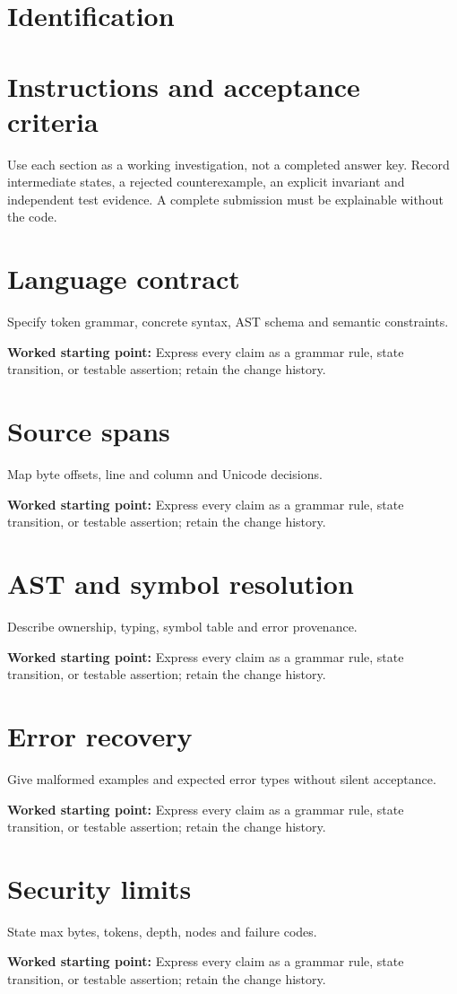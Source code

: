 \documentclass[11pt,letterpaper]{article}
\begin{document}
\makedoctitle\makedocsummary
\tableofcontents\clearpage
\section{Identification}
\section{Instructions and acceptance criteria}
Use each section as a working investigation, not a completed answer key. Record intermediate states, a rejected counterexample, an explicit invariant and independent test evidence. A complete submission must be explainable without the code.
\section{Language contract}
Specify token grammar, concrete syntax, AST schema and semantic constraints.\par\textbf{Worked starting point:} Express every claim as a grammar rule, state transition, or testable assertion; retain the change history.
\section{Source spans}
Map byte offsets, line and column and Unicode decisions.\par\textbf{Worked starting point:} Express every claim as a grammar rule, state transition, or testable assertion; retain the change history.
\section{AST and symbol resolution}
Describe ownership, typing, symbol table and error provenance.\par\textbf{Worked starting point:} Express every claim as a grammar rule, state transition, or testable assertion; retain the change history.
\section{Error recovery}
Give malformed examples and expected error types without silent acceptance.\par\textbf{Worked starting point:} Express every claim as a grammar rule, state transition, or testable assertion; retain the change history.
\section{Security limits}
State max bytes, tokens, depth, nodes and failure codes.\par\textbf{Worked starting point:} Express every claim as a grammar rule, state transition, or testable assertion; retain the change history.
\end{document}
